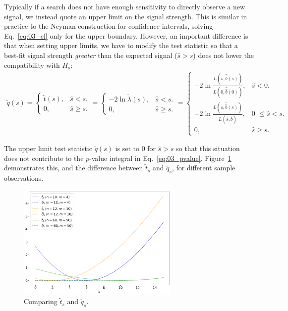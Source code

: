 Typically if a search does not have enough sensitivity to directly observe a new signal, we instead quote an upper limit on the signal strength. 
This is similar in practice to the Neyman construction for confidence intervals, solving Eq.~\ref{eq:03_cl} only for the upper boundary. However, an important difference is that when setting upper limits, we have to modify the test statistic so that a best-fit signal strength \textit{greater} than the expected signal ($\hat{s} > s$) does not lower the compatibility with $H_s$:
\begin{gather}
    \tilde{q}(s) = \left\{
        \begin{array}{ll}
          \tilde{t}(s), & \mbox{$\hat{s} < s$}.\\
          0, & \mbox{$\hat{s} \geq s$}.
        \end{array}
      \right.
      = \left\{
        \begin{array}{ll}
          -2\ln\tilde{\lambda}(s), & \mbox{$\hat{s} < s$}.\\
          0, & \mbox{$\hat{s} \geq s$}.
        \end{array}
      \right.
      = \left\{
      \begin{array}{ll}
          -2\ln\frac{L(s, \hat{\hat{b}}(s))}{L(0, \hat{\hat{b}}(0))}, & \mbox{$\hat{s}<0$}.\\
          -2\ln\frac{L(s, \hat{\hat{b}}(s))}{L(\hat{s}, \hat{b})}, & \mbox{0 $\leq \hat{s} < s$}.\\
          0, & \mbox{$\hat{s} \geq s$}.
        \end{array}
      \right.
  \label{eq:03_qs_tilde}
\end{gather}

The upper limit test statistic $\tilde{q}(s)$ is set to $0$ for $\hat{s} > s$ so that this situation does not contribute to the $p$-value integral in Eq.~\ref{eq:03_pvalue}.
Figure~\ref{fig:03_q_tilde_s} demonstrates this, and the difference between $\tilde{t}_s$ and $\tilde{q}_s$, for different sample observations.

\begin{figure}[htb]
\centering
\includegraphics[width=0.7\textwidth]{figures/03-Stats/03-intervals-and-limits/2.png}
\captionsetup{justification=centering}
\caption{Comparing $\tilde{t}_s$ and $\tilde{q}_s$.}
\label{fig:03_q_tilde_s}
\end{figure}


